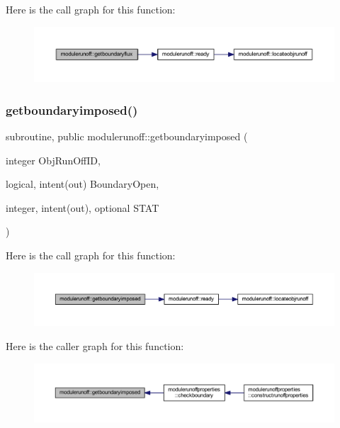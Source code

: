 Here is the call graph for this function\+:\nopagebreak
\begin{figure}[H]
\begin{center}
\leavevmode
\includegraphics[width=350pt]{namespacemodulerunoff_aa5c3e304953e0e305461bb0ef472e0f8_cgraph}
\end{center}
\end{figure}
\mbox{\label{namespacemodulerunoff_a721381be9f2b0f07b9349c1a1df63001}} 
\subsubsection{\texorpdfstring{getboundaryimposed()}{getboundaryimposed()}}
{\footnotesize\ttfamily subroutine, public modulerunoff\+::getboundaryimposed (\begin{DoxyParamCaption}\item[{integer}]{Obj\+Run\+Off\+ID,  }\item[{logical, intent(out)}]{Boundary\+Open,  }\item[{integer, intent(out), optional}]{S\+T\+AT }\end{DoxyParamCaption})}

Here is the call graph for this function\+:\nopagebreak
\begin{figure}[H]
\begin{center}
\leavevmode
\includegraphics[width=350pt]{namespacemodulerunoff_a721381be9f2b0f07b9349c1a1df63001_cgraph}
\end{center}
\end{figure}
Here is the caller graph for this function\+:\nopagebreak
\begin{figure}[H]
\begin{center}
\leavevmode
\includegraphics[width=350pt]{namespacemodulerunoff_a721381be9f2b0f07b9349c1a1df63001_icgraph}
\end{center}
\end{figure}
\mbox{\label{namespacemodulerunoff_a35dbdf0f3737830c01b78496fc043851}} 
